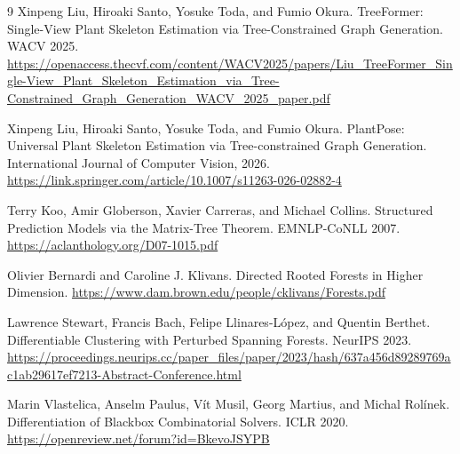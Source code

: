 \documentclass[11pt,a4paper]{article}
\begin{document}
\newpage
\begin{thebibliography}{9}
Xinpeng Liu, Hiroaki Santo, Yosuke Toda, and Fumio Okura.
\newblock TreeFormer: Single-View Plant Skeleton Estimation via Tree-Constrained Graph Generation.
\newblock WACV 2025.
\newblock \url{https://openaccess.thecvf.com/content/WACV2025/papers/Liu_TreeFormer_Single-View_Plant_Skeleton_Estimation_via_Tree-Constrained_Graph_Generation_WACV_2025_paper.pdf}

Xinpeng Liu, Hiroaki Santo, Yosuke Toda, and Fumio Okura.
\newblock PlantPose: Universal Plant Skeleton Estimation via Tree-constrained Graph Generation.
\newblock International Journal of Computer Vision, 2026.
\newblock \url{https://link.springer.com/article/10.1007/s11263-026-02882-4}

Terry Koo, Amir Globerson, Xavier Carreras, and Michael Collins.
\newblock Structured Prediction Models via the Matrix-Tree Theorem.
\newblock EMNLP-CoNLL 2007.
\newblock \url{https://aclanthology.org/D07-1015.pdf}

Olivier Bernardi and Caroline J. Klivans.
\newblock Directed Rooted Forests in Higher Dimension.
\newblock \url{https://www.dam.brown.edu/people/cklivans/Forests.pdf}

Lawrence Stewart, Francis Bach, Felipe Llinares-López, and Quentin Berthet.
\newblock Differentiable Clustering with Perturbed Spanning Forests.
\newblock NeurIPS 2023.
\newblock \url{https://proceedings.neurips.cc/paper_files/paper/2023/hash/637a456d89289769ac1ab29617ef7213-Abstract-Conference.html}

Marin Vlastelica, Anselm Paulus, Vít Musil, Georg Martius, and Michal Rolínek.
\newblock Differentiation of Blackbox Combinatorial Solvers.
\newblock ICLR 2020.
\newblock \url{https://openreview.net/forum?id=BkevoJSYPB}
\end{thebibliography}
\end{document}
